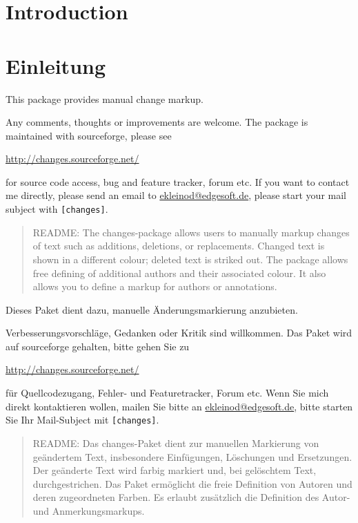 
\ifENGLISH
	\section{Introduction}
\fi
	\ifGERMAN
		\section{Einleitung}
	\fi

\ifENGLISH
	This package provides manual change markup.

	Any comments, thoughts or improvements are welcome.
	The package is maintained with sourceforge, please see

	\url{http://changes.sourceforge.net/}

	for source code access, bug and feature tracker, forum etc.
	If you want to contact me directly, please send an email to \href{mailto:ekleinod@edgesoft.de}{ekleinod@edgesoft.de}, please start your mail subject with \texttt{[changes]}.

	\begin{quote}
		\small\textsc{README:}
		The changes-package allows users to manually markup changes of text such as additions, deletions, or replacements.
		Changed text is shown in a different colour; deleted text is striked out.
		The package allows free defining of additional authors and their associated colour.
		It also allows you to define a markup for authors or annotations.
	\end{quote}
\fi
	\ifGERMAN
		Dieses Paket dient dazu, manuelle Änderungsmarkierung anzubieten.

		Verbesserungsvorschläge, Gedanken oder Kritik sind willkommen.
		Das Paket wird auf sourceforge gehalten, bitte gehen Sie zu

		\url{http://changes.sourceforge.net/}

		für Quellcodezugang, Fehler- und Featuretracker, Forum etc.
		Wenn Sie mich direkt kontaktieren wollen, mailen Sie bitte an \href{mailto:ekleinod@edgesoft.de}{ekleinod@edgesoft.de}, bitte starten Sie Ihr Mail-Subject mit \texttt{[changes]}.

		\begin{quote}
			\small\textsc{README:}
			Das changes-Paket dient zur manuellen Markierung von geändertem Text, insbesondere Einfügungen, Löschungen und Ersetzungen.
			Der geänderte Text wird farbig markiert und, bei gelöschtem Text, durchgestrichen.
			Das Paket ermöglicht die freie Definition von Autoren und deren zugeordneten Farben.
			Es erlaubt zusätzlich die Definition des Autor- und Anmerkungsmarkups.
		\end{quote}
	\fi


